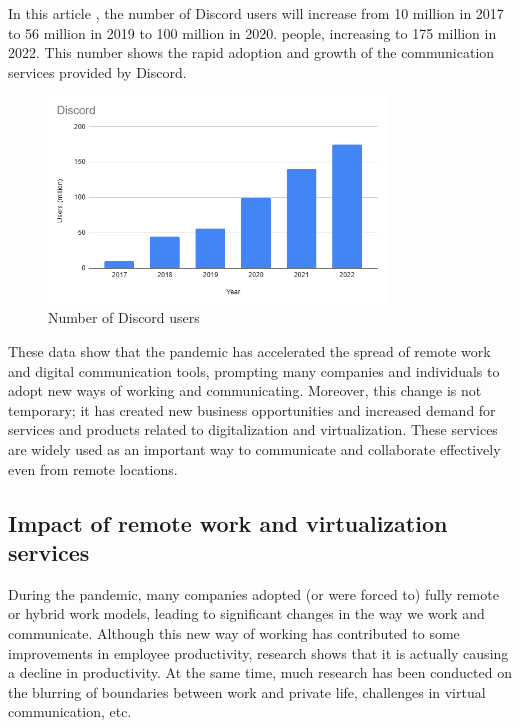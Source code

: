 \documentclass[12pt]{article}
\begin{document}
In this article \cite{ref8}, the
number of Discord users will increase from 10 million in 2017 to 56 million in
2019 to 100 million in 2020. people, increasing to 175 million in 2022. This
number shows the rapid adoption and growth of the communication services
provided by Discord.

\begin{figure}[H]
    \centering
    \includegraphics[width=0.8\textwidth]{discord.png}
    \caption{Number of Discord users}
    \label{fig:my_label}
\end{figure}

These data show that the pandemic has accelerated the spread of remote work and
digital communication tools, prompting many companies and individuals to adopt
new ways of working and communicating. Moreover, this change is not temporary;
it has created new business opportunities and increased demand for services and
products related to digitalization and virtualization. These services are
widely used as an important way to communicate and collaborate effectively even
from remote locations.

\subsection{Impact of remote work and virtualization services}
During the pandemic, many companies adopted (or were forced to) fully remote or
hybrid work models, leading to significant changes in the way we work and
communicate. Although this new way of working has contributed to some
improvements in employee productivity, research shows that it is actually
causing a decline in productivity. At the same time, much research has been
conducted on the blurring of boundaries between work and private life,
challenges in virtual communication, etc.
\end{document}
